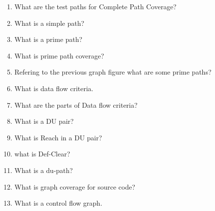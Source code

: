 \documentclass[10pt]{article}
\begin{document}
\begin{enumerate}
    \item What are the test paths for Complete Path Coverage?\\

    \item What is a simple path?\\

    \item What is a prime path?\\

    \item What is prime path coverage?\\

    \item Refering to the previous graph figure what are some prime paths?\\

    \item What is data flow criteria.\\

    \item What are the parts of Data flow criteria?\\

    \item What is a DU pair?\\

    \item What is Reach in a DU pair?\\

    \item what is Def-Clear?\\

    \item What is a du-path?

    \item What is graph coverage for source code?\\

    \item What is a control flow graph.\\




\end{enumerate}
\end{document}
